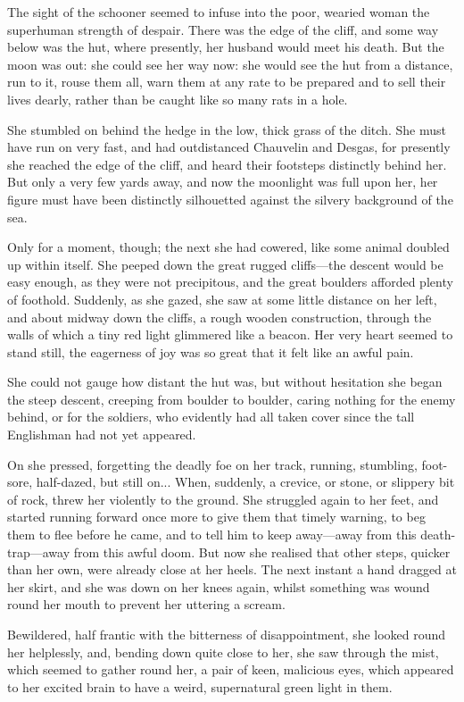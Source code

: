 \documentclass[paper=a5,BCOR=7mm,twoside,DIV=calc,12pt,usegeometry,chapterprefix,endperiod,headings=big]{scrbook}
\begin{document}
The sight of the schooner seemed to infuse into the poor, wearied woman the superhuman strength of despair. There was the edge of the cliff, and some way below was the hut, where presently, her husband would meet his death. But the moon was out: she could see her way now: she would see the hut from a distance, run to it, rouse them all, warn them at any rate to be prepared and to sell their lives dearly, rather than be caught like so many rats in a hole.

She stumbled on behind the hedge in the low, thick grass of the ditch. She must have run on very fast, and had outdistanced Chauvelin and Desgas, for presently she reached the edge of the cliff, and heard their footsteps distinctly behind her. But only a very few yards away, and now the moonlight was full upon her, her figure must have been distinctly silhouetted against the silvery background of the sea.

Only for a moment, though; the next she had cowered, like some animal doubled up within itself. She peeped down the great rugged cliffs---the descent would be easy enough, as they were not precipitous, and the great boulders afforded plenty of foothold. Suddenly, as she gazed, she saw at some little distance on her left, and about midway down the cliffs, a rough wooden construction, through the walls of which a tiny red light glimmered like a beacon. Her very heart seemed to stand still, the eagerness of joy was so great that it felt like an awful pain.

She could not gauge how distant the hut was, but without hesitation she began the steep descent, creeping from boulder to boulder, caring nothing for the enemy behind, or for the soldiers, who evidently had all taken cover since the tall Englishman had not yet appeared.

On she pressed, forgetting the deadly foe on her track, running, stumbling, foot-sore, half-dazed, but still on... When, suddenly, a crevice, or stone, or slippery bit of rock, threw her violently to the ground. She struggled again to her feet, and started running forward once more to give them that timely warning, to beg them to flee before he came, and to tell him to keep away---away from this death-trap---away from this awful doom. But now she realised that other steps, quicker than her own, were already close at her heels. The next instant a hand dragged at her skirt, and she was down on her knees again, whilst something was wound round her mouth to prevent her uttering a scream.

Bewildered, half frantic with the bitterness of disappointment, she looked round her helplessly, and, bending down quite close to her, she saw through the mist, which seemed to gather round her, a pair of keen, malicious eyes, which appeared to her excited brain to have a weird, supernatural green light in them.
\end{document}
